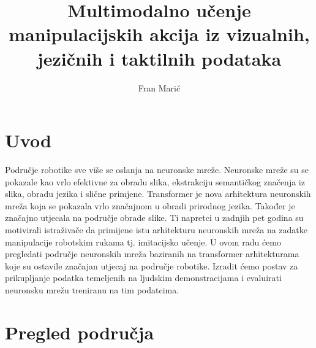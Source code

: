 \documentclass[times, utf8, diplomski]{fer}
\begin{document}

\title{Multimodalno učenje manipulacijskih akcija iz vizualnih, jezičnih i taktilnih
podataka}

\author{Fran Marić}

\maketitle

\izvornik


\tableofcontents

\chapter{Uvod}
Područje robotike sve više se oslanja na neuronske mreže. Neuronske mreže su se pokazale kao vrlo efektivne za obradu slika, ekstrakciju semantičkog značenja iz slika, obradu jezika i slične primjene. Transformer je nova arhitektura neuronskih mreža koja se pokazala vrlo značajnom u obradi prirodnog jezika. Također je značajno utjecala na područje obrade slike. Ti napretci u zadnjih pet godina su motivirali istraživače da primijene istu arhitekturu neuronskih mreža na zadatke manipulacije robotskim rukama tj. imitacijsko učenje. U ovom radu ćemo pregledati područje neuronskih mreža baziranih na transformer arhitekturama koje su ostavile značajan utjecaj na područje robotike. Izradit ćemo postav za prikupljanje podatka temeljenih na ljudskim demonstracijama i evaluirati neuronsku mrežu treniranu na tim podatcima.

\chapter{Pregled područja}
\end{document}
